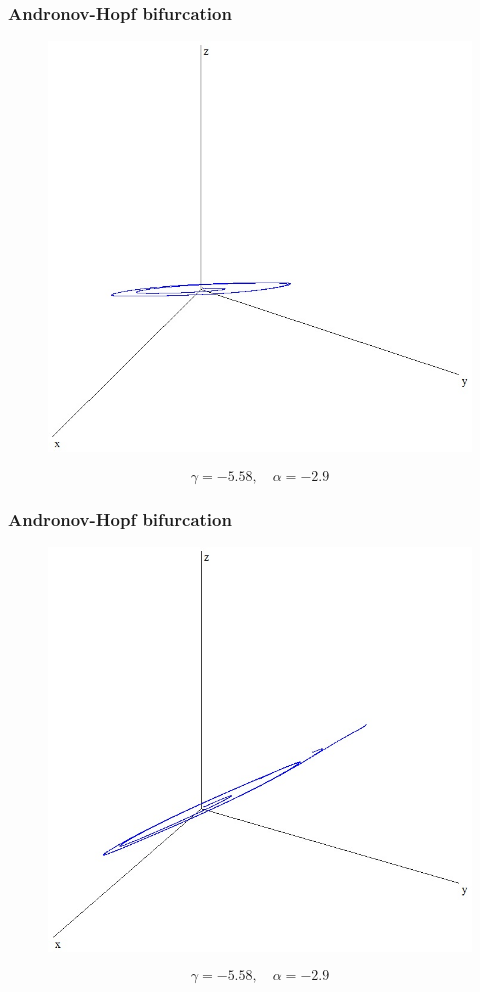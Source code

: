 \documentclass[fullscreen=true, unicode, bookmarks=false]{beamer}
\begin{document}
\begin{frame}
\frametitle{ Andronov-Hopf bifurcation } 

\begin{figure}
\includegraphics[scale=0.4]{AH.jpg} 
\end{figure}
{\footnotesize $$ \gamma = -5.58, \quad \alpha = -2.9 $$}

\end{frame}

\begin{frame}
\frametitle{ Andronov-Hopf bifurcation } 

\begin{figure}
\includegraphics[scale=0.4]{AH2.jpg} 
\end{figure}
{\footnotesize $$ \gamma = -5.58, \quad \alpha = -2.9 $$}

\end{frame}
\end{document}

